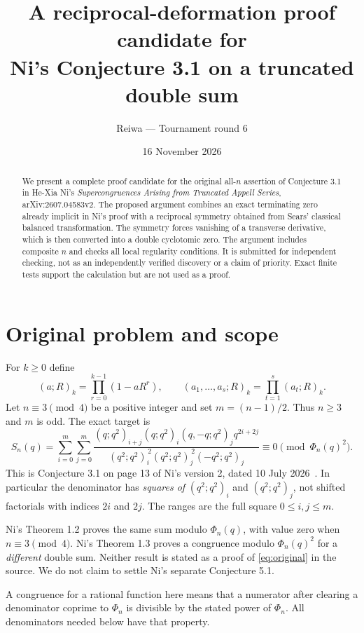 \documentclass[11pt]{article}
\title{A reciprocal-deformation proof candidate for\\Ni's Conjecture 3.1 on a truncated double sum}
\author{Reiwa --- Tournament round 6}
\date{16 November 2026}
\newcommand{\qp}[3]{(#1;#2)_{#3}}
\begin{document}
\maketitle
\begin{abstract}
We present a complete proof candidate for the original all-$n$ assertion of
Conjecture 3.1 in He-Xia Ni's \emph{Supercongruences Arising from Truncated
Appell Series}, arXiv:2607.04583v2. The proposed argument combines an exact
terminating zero already implicit in Ni's proof with a reciprocal symmetry
obtained from Sears' classical balanced transformation. The symmetry forces
vanishing of a transverse derivative, which is then converted into a double
cyclotomic zero. The argument includes composite $n$ and checks all local
regularity conditions. It is submitted for independent checking, not as an
independently verified discovery or a claim of priority. Exact finite tests
support the calculation but are not used as a proof.
\end{abstract}

\section{Original problem and scope}
For $k\geq0$ define
\[
\qp{a}{R}{k}=\prod_{r=0}^{k-1}(1-aR^r),\qquad
\qp{a_1,\ldots,a_s}{R}{k}=\prod_{t=1}^s\qp{a_t}{R}{k}.
\]
Let $n\equiv3\pmod4$ be a positive integer and set $m=(n-1)/2$.
Thus $n\geq3$ and $m$ is odd. The exact target is
\begin{equation}\label{eq:original}
 S_n(q)=\sum_{i=0}^{m}\sum_{j=0}^{m}
 \frac{\qp{q}{q^2}{i+j}\qp{q}{q^2}{i}\qp{q,-q}{q^2}{j}
 q^{2i+2j}}
 {\qp{q^2}{q^2}{i}^{\,2}\qp{q^2}{q^2}{j}^{\,2}
 \qp{-q^2}{q^2}{j}}
 \equiv0\pmod{\Phi_n(q)^2}.
\end{equation}
This is Conjecture 3.1 on page 13 of Ni's version 2, dated 10 July
2026~\cite{Ni}. In particular the denominator has \emph{squares of}
$\qp{q^2}{q^2}{i}$ and $\qp{q^2}{q^2}{j}$, not shifted factorials with indices
$2i$ and $2j$. The ranges are the full square $0\leq i,j\leq m$.

Ni's Theorem 1.2 proves the same sum modulo $\Phi_n(q)$, with value zero
when $n\equiv3\pmod4$. Ni's Theorem 1.3 proves a congruence modulo
$\Phi_n(q)^2$ for a \emph{different} double sum. Neither result is stated as
a proof of \eqref{eq:original} in the source. We do not claim to settle
Ni's separate Conjecture 5.1.

A congruence for a rational function here means that a numerator after
clearing a denominator coprime to $\Phi_n$ is divisible by the stated power
of $\Phi_n$. All denominators needed below have that property.
\end{document}
